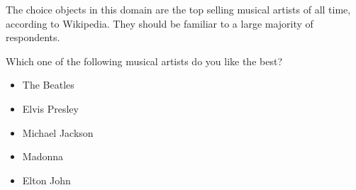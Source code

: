 
The choice objects in this domain are the top selling musical artists of all time, according to Wikipedia.
They should be familiar to a large majority of respondents.

\begin{tcolorbox}
Which one of the following musical artists do you like the best?

\begin{itemize}
	\setlength\itemsep{-5pt}
	\item The Beatles
	\item Elvis Presley
	\item Michael Jackson
	\item Madonna
	\item Elton John
\end{itemize}
\end{tcolorbox}
